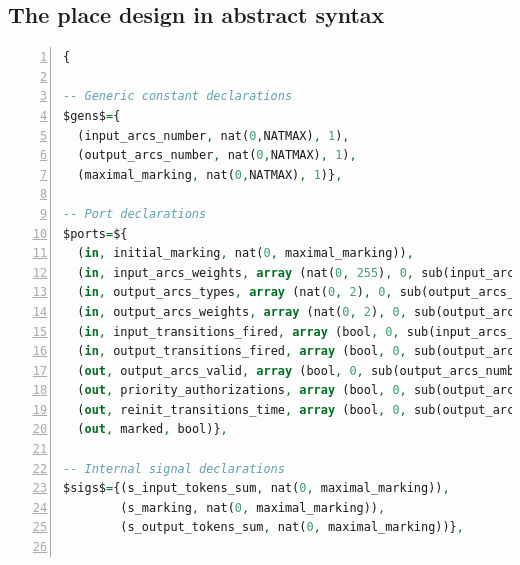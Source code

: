 \documentclass[pdflatex,sn-mathphys]{sn-jnl}%
\theoremstyle{thmstyleone}%
\theoremstyle{thmstyletwo}%
\theoremstyle{thmstylethree}%
\begin{document}
\clearpage
\begin{appendices}

\section{The place design in abstract \hvhdl{} syntax}
\label{app:place-design}

\begin{lstlisting}[language=VHDL,
  label={lst:place-design-abss},
  caption={The \texttt{place} design in \hvhdl{} abstract syntax.},
  basicstyle=\fontsize{8}{10}\selectfont,
  framexleftmargin=1.5em,
  xleftmargin=2em,
  numbers=left,
  numberstyle=\tiny\ttfamily]
{
    
-- Generic constant declarations
$gens$={
  (input_arcs_number, nat(0,NATMAX), 1), 
  (output_arcs_number, nat(0,NATMAX), 1),
  (maximal_marking, nat(0,NATMAX), 1)},

-- Port declarations
$ports=${
  (in, initial_marking, nat(0, maximal_marking)),
  (in, input_arcs_weights, array (nat(0, 255), 0, sub(input_arcs_number, 1))),
  (in, output_arcs_types, array (nat(0, 2), 0, sub(output_arcs_number, 1))),
  (in, output_arcs_weights, array (nat(0, 2), 0, sub(output_arcs_number, 1))),
  (in, input_transitions_fired, array (bool, 0, sub(input_arcs_number, 1))),          
  (in, output_transitions_fired, array (bool, 0, sub(output_arcs_number, 1))),
  (out, output_arcs_valid, array (bool, 0, sub(output_arcs_number, 1))),
  (out, priority_authorizations, array (bool, 0, sub(output_arcs_number, 1))),
  (out, reinit_transitions_time, array (bool, 0, sub(output_arcs_number, 1))),
  (out, marked, bool)},
  
-- Internal signal declarations
$sigs$={(s_input_tokens_sum, nat(0, maximal_marking)),
        (s_marking, nat(0, maximal_marking)),
        (s_output_tokens_sum, nat(0, maximal_marking))},
       

\end{lstlisting}
\end{appendices}
\end{document}
